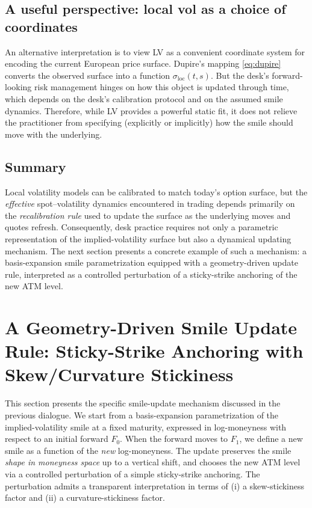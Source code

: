 \documentclass[11pt,a4paper]{report}
\begin{document}
\subsection{A useful perspective: local vol as a choice of coordinates}
An alternative interpretation is to view LV as a convenient coordinate system for encoding the current European price surface.
Dupire's mapping \eqref{eq:dupire} converts the observed surface into a function $\sigma_{\mathrm{loc}}(t,s)$.
But the desk's forward-looking risk management hinges on how this object is updated through time, which depends on the desk's calibration protocol and on the assumed smile dynamics.
Therefore, while LV provides a powerful static fit, it does not relieve the practitioner from specifying (explicitly or implicitly) how the smile should move with the underlying.

\subsection{Summary}
Local volatility models can be calibrated to match today's option surface, but the \emph{effective} spot--volatility dynamics encountered in trading depends primarily on the \emph{recalibration rule} used to update the surface as the underlying moves and quotes refresh.
Consequently, desk practice requires not only a parametric representation of the implied-volatility surface but also a dynamical updating mechanism.
The next section presents a concrete example of such a mechanism: a basis-expansion smile parametrization equipped with a geometry-driven update rule, interpreted as a controlled perturbation of a sticky-strike anchoring of the new ATM level.

\section{A Geometry-Driven Smile Update Rule: Sticky-Strike Anchoring with Skew/Curvature Stickiness}
\label{sec:geometry_driven_update_model}

This section presents the specific smile-update mechanism discussed in the previous dialogue.
We start from a basis-expansion parametrization of the implied-volatility smile at a fixed maturity, expressed in log-moneyness with respect to an initial forward $F_0$.
When the forward moves to $F_1$, we define a new smile as a function of the \emph{new} log-moneyness.
The update preserves the smile \emph{shape in moneyness space} up to a vertical shift, and chooses the new ATM level via a controlled perturbation of a simple sticky-strike anchoring.
The perturbation admits a transparent interpretation in terms of (i) a skew-stickiness factor and (ii) a curvature-stickiness factor.
\end{document}
